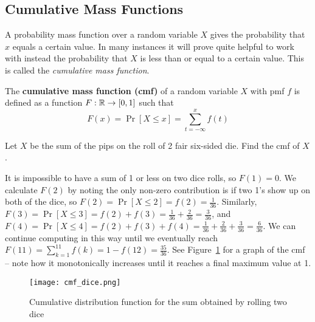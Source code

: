 \documentclass[../main.tex]{subfiles}
\begin{document}
\subsection{Cumulative Mass Functions}
A probability mass function over a random variable $X$ gives the probability 
that $x$ equals a certain value. In many instances it will prove quite helpful 
to work with instead the probability that $X$ is less than or equal to a 
certain value. This is called the \textit{cumulative mass function}.
\begin{definition}
The \textbf{cumulative mass function (cmf)} of a random variable $X$ with 
pmf $f$ is defined as a function $F: \mathbb{R}\rightarrow[0,1]$ such that
$$F(x) = \Pr[X \leq x] = \sum_{t = -\infty}^x f(t)$$
\end{definition}
\begin{example}Let $X$ be the sum of the pips on the roll of 2 fair six-sided
die. Find the cmf of $X$.
\end{example}
\begin{solution}
It is impossible to have a sum of 1 or less on two dice rolls, so $F(1) = 0$. We calculate $F(2)$ by noting the only non-zero contribution is if two 1's show up on both of the dice, so $F(2) = \Pr[X \leq 2] = f(2) = \frac{1}{36}$. Similarly, $F(3) = \Pr[X \leq 3] = f(2) + f(3) = \frac{1}{36} + \frac{2}{36} = \frac{3}{36}$, and $F(4) = \Pr[X \leq 4] =  f(2) + f(3) + f(4)= \frac{1}{36} + \frac{2}{36} + \frac{3}{36} = \frac{6}{36}$. We can continue computing in this way until we eventually reach $F(11) = \displaystyle\sum_{k=1}^{11} f(k) = 1-f(12) = \frac{35}{36}$. See Figure~\ref{fig:cmf_dice} for a graph of the cmf -- note how it monotonically increases until it reaches a final maximum value at 1. 
\begin{figure}
	\centering
	\texttt{[image: cmf\_dice.png]}
	\caption{Cumulative distribution function for the sum obtained by rolling two dice}
	\label{fig:cmf_dice}
\end{figure}

\end{solution}
\end{document}
